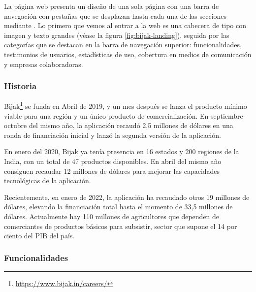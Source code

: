 La página web presenta un diseño de una sola página con una barra de navegación con pestañas que se desplazan hasta cada una de las secciones mediante . Lo primero que vemos al entrar a la web es una cabecera de tipo  con imagen y texto grandes (véase la figura \ref{fig:bijak-landing}), seguida por las categorías que se destacan en la barra de navegación superior: funcionalidades, testimonios de usuarios, estadísticas de uso, cobertura en medios de comunicación y empresas colaboradoras.


\subsubsection{Historia}

Bijak\footnote{\url{https://www.bijak.in/careers/}} se funda en Abril de 2019, y un mes después se lanza el producto mínimo viable para una región y un único producto de comercialización. En septiembre-octubre del mismo año, la aplicación recaudó 2,5 millones de dólares en una ronda de financiación inicial y lanzó la segunda versión de la aplicación.

En enero del 2020, Bijak ya tenía presencia en 16 estados y 200 regiones de la India, con un total de 47 productos disponibles. En abril del mismo año consiguen recaudar 12 millones de dólares para mejorar las capacidades tecnológicas de la aplicación.

Recientemente, en enero de 2022, la aplicación ha recaudado otros 19 millones de dólares, elevando la financiación total hasta el momento de 33,5 millones de dólares. Actualmente hay 110 millones de agricultores que dependen de comerciantes de productos básicos para subsistir, sector que supone el 14 por ciento del PIB del país.

\subsubsection{Funcionalidades}

